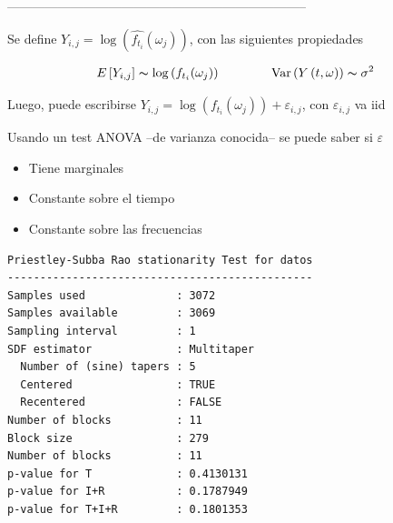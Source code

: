 \documentclass[12pt,a4paper]{mitthesis}
\begin{document}
%
%
%
-----------------------------------------------------------------------

Se define $Y_{i,j} = \log \left( \widehat{f_{t_i}}(\omega_j) \right)$, con las siguientes propiedades

\begin{equation*}
E\left[ Y_{i,j} \right] \thicksim \log \left( f_{t_i}(\omega_j) \right)
\hspace{4em}
\text{Var}\left( {Y\left(t,\omega\right)}\right) \thicksim \sigma^{2}
\end{equation*}

Luego, puede escribirse $Y_{i,j} = \log \left( f_{t_i}(\omega_j) \right) + \varepsilon_{i,j}$,
con $\varepsilon_{i,j}$ va iid

Usando un test ANOVA --de varianza conocida-- se puede saber si $\varepsilon$
\vspace{-1em}
\begin{itemize}
\item Tiene marginales
\item Constante sobre el tiempo
\item Constante sobre las frecuencias
\end{itemize}

\begin{lstlisting}
Priestley-Subba Rao stationarity Test for datos
-----------------------------------------------
Samples used              : 3072 
Samples available         : 3069 
Sampling interval         : 1 
SDF estimator             : Multitaper 
  Number of (sine) tapers : 5 
  Centered                : TRUE 
  Recentered              : FALSE 
Number of blocks          : 11 
Block size                : 279 
Number of blocks          : 11 
p-value for T             : 0.4130131 
p-value for I+R           : 0.1787949 
p-value for T+I+R         : 0.1801353 
\end{lstlisting}
\end{document}
